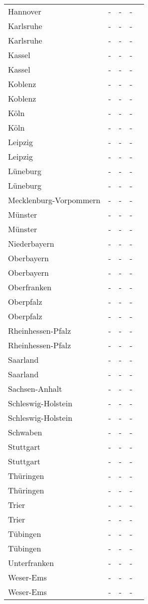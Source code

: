 \begin{table}[H]
\begin{tabularx}{\textwidth}{Xcccc}
            Hannover & - & - & - \\
            Karlsruhe & - & - & - \\
            Karlsruhe & - & - & - \\
            Kassel & - & - & - \\
            Kassel & - & - & - \\
            Koblenz & - & - & - \\
            Koblenz & - & - & - \\
            Köln & - & - & - \\
            Köln & - & - & - \\
            Leipzig & - & - & - \\
            Leipzig & - & - & - \\
            Lüneburg & - & - & - \\
            Lüneburg & - & - & - \\
            Mecklenburg-Vorpommern & - & - & - \\
            Münster & - & - & - \\
            Münster & - & - & - \\
            Niederbayern & - & - & - \\
            Oberbayern & - & - & - \\
            Oberbayern & - & - & - \\
            Oberfranken & - & - & - \\
            Oberpfalz & - & - & - \\
            Oberpfalz & - & - & - \\
            Rheinhessen-Pfalz & - & - & - \\
            Rheinhessen-Pfalz & - & - & - \\
            Saarland & - & - & - \\
            Saarland & - & - & - \\
            Sachsen-Anhalt & - & - & - \\
            Schleswig-Holstein & - & - & - \\
            Schleswig-Holstein & - & - & - \\
            Schwaben & - & - & - \\
            Stuttgart & - & - & - \\
            Stuttgart & - & - & - \\
            Thüringen & - & - & - \\
            Thüringen & - & - & - \\
            Trier & - & - & - \\
            Trier & - & - & - \\
            Tübingen & - & - & - \\
            Tübingen & - & - & - \\
            Unterfranken & - & - & - \\
            Weser-Ems & - & - & - \\
            Weser-Ems & - & - & - \\
        \bottomrule
    \end{tabularx}
\end{table}
    
